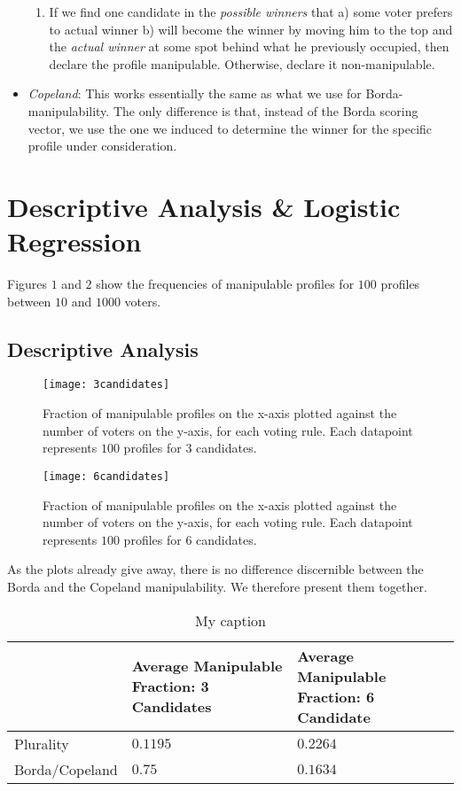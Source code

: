 \documentclass[10pt,a4paper]{article}
\begin{document}
\begin{itemize}
\begin{enumerate}
\item If we find one candidate in the \textit{possible winners} that a) some voter prefers to actual winner b) will become the winner by moving him to the top and the \textit{actual winner} at some spot behind what he previously occupied, then declare the profile manipulable. Otherwise, declare it non-manipulable.
\end{enumerate}
\item \textit{Copeland}: This works essentially the same as what we use for Borda-manipulability. The only difference is that, instead of the Borda scoring vector, we use the one we induced to determine the winner for the specific profile under consideration.
\end{itemize}
\section{Descriptive Analysis \& Logistic Regression}
Figures $1$ and $2$ show the frequencies of manipulable profiles for $100$ profiles between $10$ and $1000$ voters.
\subsection{Descriptive Analysis}
\begin{SCfigure}[0.5][h]
\caption{Fraction of manipulable profiles on the x-axis plotted against the number of voters on the y-axis, for each voting rule. Each datapoint represents $100$ profiles for $3$ candidates.}
\texttt{[image: 3candidates]}
\end{SCfigure}

\begin{SCfigure}[0.5][h]
\caption{Fraction of manipulable profiles on the x-axis plotted against the number of voters on the y-axis, for each voting rule. Each datapoint represents $100$ profiles for $6$ candidates.}
\texttt{[image: 6candidates]}
\end{SCfigure}

As the plots already give away, there is no difference discernible between the Borda and the Copeland manipulability. We therefore present them together.

\begin{table}[]
\centering
\caption{My caption}
\label{my-label}
\begin{tabular}{|l|l|l|}
\hline
               & Average Manipulable Fraction: 3 Candidates & Average Manipulable Fraction: 6 Candidate \\ \hline
Plurality      & $0.1195$                                   & $0.2264$                                  \\ \hline
Borda/Copeland & $0.75$                                     & $0.1634$                                  \\ \hline
\end{tabular}
\end{table}
\end{document}
